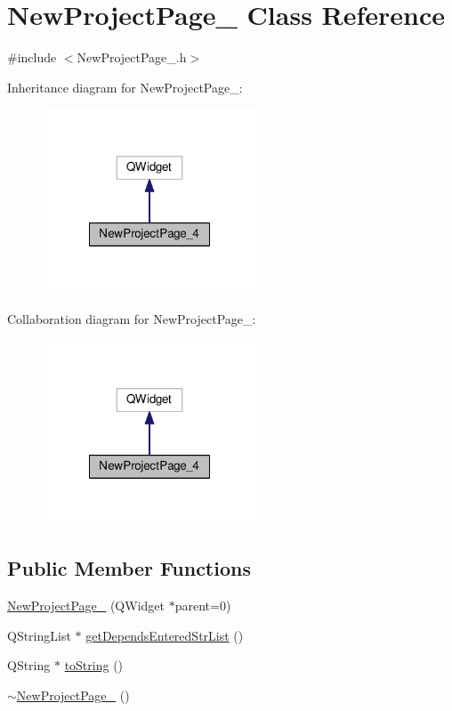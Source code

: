 \hypertarget{class_new_project_page__4}{\section{New\-Project\-Page\-\_ Class Reference}
\label{class_new_project_page__4}
}


{\ttfamily \#include $<$New\-Project\-Page\-\_.\-h$>$}



Inheritance diagram for New\-Project\-Page\-\_\-:\nopagebreak
\begin{figure}[H]
\begin{center}
\leavevmode
\includegraphics[width=180pt]{class_new_project_page__4__inherit__graph}
\end{center}
\end{figure}


Collaboration diagram for New\-Project\-Page\-\_\-:\nopagebreak
\begin{figure}[H]
\begin{center}
\leavevmode
\includegraphics[width=180pt]{class_new_project_page__4__coll__graph}
\end{center}
\end{figure}
\subsection*{Public Member Functions}
\begin{DoxyCompactItemize}
\item 
\hyperlink{class_new_project_page__4_a597c1449a4bc9403c2c0983f19b67aa9}{New\-Project\-Page\-\_} (Q\-Widget $\ast$parent=0)
\item 
Q\-String\-List $\ast$ \hyperlink{class_new_project_page__4_a971279a2a9292d56e4c8e94a071971eb}{get\-Depends\-Entered\-Str\-List} ()
\item 
Q\-String $\ast$ \hyperlink{class_new_project_page__4_a3ade3019e0f7095c4e9b6c04ad6e4229}{to\-String} ()
\item 
\hyperlink{class_new_project_page__4_ac347c7499b828fb711c0af9988ee878a}{$\sim$\-New\-Project\-Page\-\_} ()
\end{DoxyCompactItemize}
